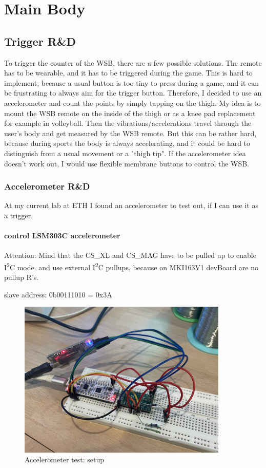 \chapter{Main Body}
\label{cha:Main Body}

\section{Trigger R\&D}
\label{sec:Trigger}
To trigger the counter of the WSB, there are a few possible solutions. The remote has to be wearable, and it has to be triggered during the game. This is hard to implement, because a usual button is too tiny to press during a game, and it can be frustrating to always aim for the trigger button. Therefore, I decided to use an accelerometer and count the points by simply tapping on the thigh. My idea is to mount the WSB remote on the inside of the thigh or as a knee pad replacement for example in volleyball. Then the vibrations/accelerations travel through the user's body and get measured by the WSB remote. But this can be rather hard, because during sports the body is always accelerating, and it could be hard to distinguish from a usual movement or a "thigh tip". If the accelerometer idea doesn't work out, I would use flexible membrane buttons to control the WSB. 

\subsection{Accelerometer R\&D}
\label{ssec:Accelerometer}
At my current lab at ETH I found an accelerometer to test out, if I can use it as a trigger.
\subsubsection{control LSM303C accelerometer}
Attention: Mind that the CS\_XL and CS\_MAG have to be pulled up to enable I\textsuperscript{2}C mode. and use external I\textsuperscript{2}C pullups, because on MKI163V1 devBoard are no pullup R's.

slave address: 0b00111010 = 0x3A \cite{DS_LSM303C}

\begin{figure}[H]
	\centering
	\includegraphics[width=10cm]{Resources/accTestLab.jpeg}
	\caption{Accelerometer test: setup}
	\label{fig:accTestLab}
\end{figure}

